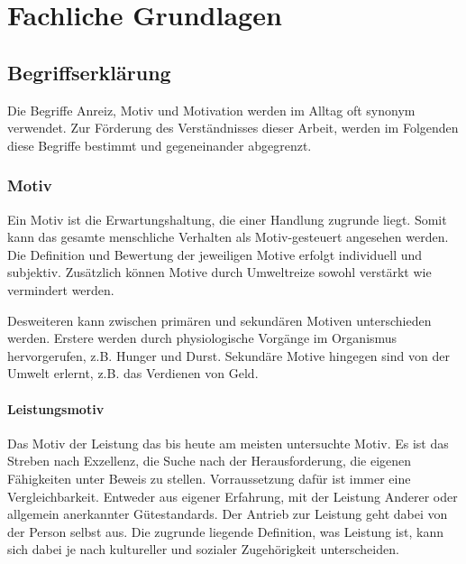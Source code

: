 \section{Fachliche Grundlagen}


\subsection{Begriffserklärung}
Die Begriffe Anreiz, Motiv und Motivation werden im Alltag oft synonym verwendet. Zur Förderung des Verständnisses dieser Arbeit, werden im Folgenden diese Begriffe bestimmt und gegeneinander abgegrenzt. \citep[S. 19]{Nowka.2013}

\subsubsection{Motiv}
Ein Motiv ist die Erwartungshaltung, die einer Handlung zugrunde liegt. Somit kann das gesamte menschliche Verhalten als Motiv-gesteuert angesehen werden. Die Definition und Bewertung der jeweiligen Motive erfolgt individuell und subjektiv. Zusätzlich können Motive durch Umweltreize sowohl verstärkt wie vermindert werden. \citep[S. 19f]{Nowka.2013}

Desweiteren kann zwischen primären und sekundären Motiven unterschieden werden. Erstere werden durch physiologische Vorgänge im Organismus hervorgerufen, z.B. Hunger und Durst. Sekundäre Motive hingegen sind von der Umwelt erlernt, z.B. das Verdienen von Geld. \citep{Jung.2011}


\paragraph{Leistungsmotiv}
Das Motiv der Leistung das bis heute am meisten untersuchte Motiv. Es ist das Streben nach Exzellenz, die Suche nach der Herausforderung, die eigenen Fähigkeiten unter Beweis zu stellen. Vorraussetzung dafür ist immer eine Vergleichbarkeit. Entweder aus eigener Erfahrung, mit der Leistung Anderer oder allgemein anerkannter Gütestandards. Der Antrieb zur Leistung geht dabei von der Person selbst aus. Die zugrunde liegende Definition, was Leistung ist, kann sich dabei je nach kultureller und sozialer Zugehörigkeit unterscheiden. \citep[S. 145f]{Brunstein.2010}


